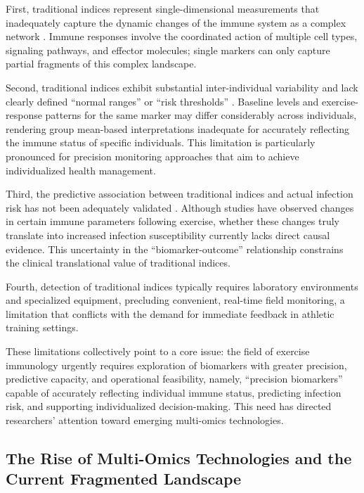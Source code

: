 \documentclass[12pt,a4paper]{article}
\begin{document}
First, traditional indices represent single-dimensional measurements that inadequately capture the dynamic changes of the immune system as a complex network \citep{nieman2020future}. Immune responses involve the coordinated action of multiple cell types, signaling pathways, and effector molecules; single markers can only capture partial fragments of this complex landscape.

Second, traditional indices exhibit substantial inter-individual variability and lack clearly defined ``normal ranges'' or ``risk thresholds'' \citep{gleeson2007immune}. Baseline levels and exercise-response patterns for the same marker may differ considerably across individuals, rendering group mean-based interpretations inadequate for accurately reflecting the immune status of specific individuals. This limitation is particularly pronounced for precision monitoring approaches that aim to achieve individualized health management.

Third, the predictive association between traditional indices and actual infection risk has not been adequately validated \citep{campbell2018debunking,nieman2019compelling}. Although studies have observed changes in certain immune parameters following exercise, whether these changes truly translate into increased infection susceptibility currently lacks direct causal evidence. This uncertainty in the ``biomarker-outcome'' relationship constrains the clinical translational value of traditional indices.

Fourth, detection of traditional indices typically requires laboratory environments and specialized equipment, precluding convenient, real-time field monitoring, a limitation that conflicts with the demand for immediate feedback in athletic training settings.

These limitations collectively point to a core issue: the field of exercise immunology urgently requires exploration of biomarkers with greater precision, predictive capacity, and operational feasibility, namely, ``precision biomarkers'' capable of accurately reflecting individual immune status, predicting infection risk, and supporting individualized decision-making. This need has directed researchers' attention toward emerging multi-omics technologies.

\subsection{The Rise of Multi-Omics Technologies and the Current Fragmented Landscape}
\end{document}

